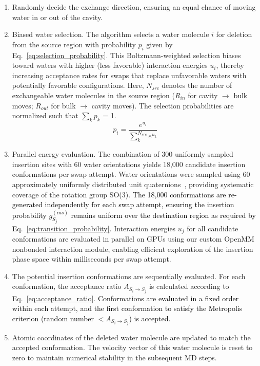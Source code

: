 \documentclass[journal=jacsat,manuscript=article]{achemso}
\newcommand*{\textblue}[1]{\textcolor{black}{#1}}
\begin{document}
\begin{enumerate}
  \item Randomly decide the exchange direction, ensuring an equal chance of moving water in or out of the cavity.
  \item Biased water selection. The algorithm selects a water molecule $i$ for deletion from the source region with probability $p_i$ given by Eq.~\ref{eq:selection_probability}. This Boltzmann-weighted selection biases toward waters with higher (less favorable) interaction energies $u_i$, 
  thereby increasing acceptance rates for swaps that replace unfavorable waters with potentially favorable configurations.
  Here, $N_{src}$ denotes the number of exchangeable water molecules in the source region ($R_{in}$ for cavity $\to$ bulk moves; $R_{out}$ for bulk $\to$ cavity moves). 
  The selection probabilities are normalized such that $\sum_{k} p_k$ = 1.
  \begin{equation}\label{eq:selection_probability}
    p_i = \frac{e^{u_i}}{\sum^{N_{src}}_k{e^{u_k}}}    
  \end{equation}
  \item Parallel energy evaluation. The combination of 300 uniformly sampled insertion sites with 60 water orientations yields 18,000 candidate insertion conformations per swap attempt. 
  Water orientations were sampled using 60 approximately uniformly distributed unit quaternions~\cite{karney2007quaternions}, providing systematic coverage of the rotation group SO(3).
  \textblue{
  The 18,000 conformations are re-generated independently for each swap attempt, ensuring the insertion probability $g^{(ins)}_{S_j}$ remains uniform over the destination region as required by Eq.~\ref{eq:transition_probability}.
  }
  Interaction energies $u_j$ for all candidate conformations are evaluated in parallel on GPUs using our custom OpenMM nonbonded interaction module, enabling efficient exploration of the insertion phase space within milliseconds per swap attempt.
  \item The potential insertion conformations are sequentially evaluated. 
  For each conformation, the acceptance ratio $A_{S_i \to S_j}$ is calculated according to Eq.~\ref{eq:acceptance_ratio}. 
  \textblue{
  Conformations are evaluated in a fixed order within each attempt, and the first conformation to satisfy the Metropolis criterion (random number  $< A_{S_i \to S_j}$) is accepted.
  }
  \item Atomic coordinates of the deleted water molecule are updated to match the accepted conformation. 
  The velocity vector of this water molecule is reset to zero to maintain numerical stability in the subsequent MD steps.
\end{enumerate}
\end{document}
